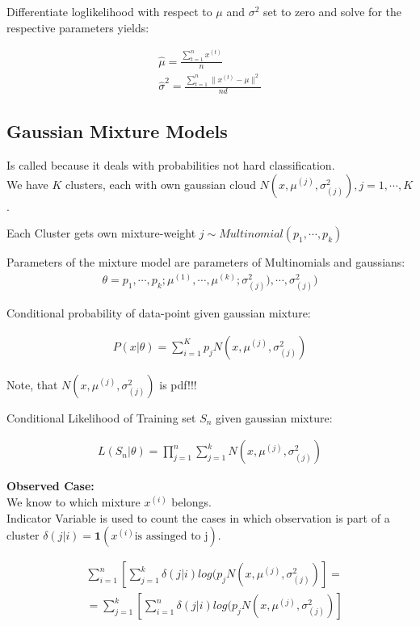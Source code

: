 Differentiate loglikelihood with respect to $\mu$ and $\sigma^2$ set to zero and solve for the respective parameters yields:

\begin{align*}
\hat{\mu } = \frac{\sum _{t=1}^{n} x^{(t)}}{n}\\
\hat{\sigma }^2 = \frac{\sum _{t=1}^ n \| x^{(t)} - \mu \| ^2}{nd}
\end{align*}


\subsection{Gaussian Mixture Models}
Is called  because it  deals with probabilities not hard classification.\\

We have $K$ clusters, each with own gaussian cloud $N(x, \mu^{(j)}, \sigma^2_{(j)}), j=1,\cdots,K$. 

Each Cluster gets own mixture-weight $j \sim Multinomial(p_1,\cdots,p_k)$ 

Parameters of the mixture model are parameters of Multinomials and gaussians: 
\begin{align*}
\theta={p_1,\cdots,p_k;\mu^{(1)},\cdots,\mu^{(k)};\sigma^2_{(j)}),\cdots,\sigma^2_{(j)})}
\end{align*}

Conditional probability of data-point given gaussian mixture:

\begin{align*}
P(x|\theta)=\sum_{i=1}^K p_j N(x,\mu^{(j)},\sigma^2_{(j)})
\end{align*}

Note, that $N(x,\mu^{(j)},\sigma^2_{(j)})$ is pdf!!!

Conditional Likelihood of Training set $S_n$ given gaussian mixture:

\begin{align*}
L(S_n|\theta)= \prod_{j=1}^{n} \sum_{j=1}^{k} N(x,\mu^{(j)},\sigma^2_{(j)})
\end{align*}

\textbf{Observed Case:}\\
We know to which mixture $x^{(i)}$ belongs.\\

Indicator Variable is used to count the cases in which observation is part of a cluster $\delta(j|i)=\textbf{1}(x^{(i)} \text{is assinged to j})$.


\begin{align*}
&\sum_{i=1}^n [\sum_{j=1}^k \delta(j|i) log (p_j N(x,\mu^{(j)},\sigma^2_{(j)})]=\\
&= \sum_{j=1}^k [\sum_{i=1}^n \delta(j|i) log (p_j N(x,\mu^{(j)},\sigma^2_{(j)})]\\
\end{align*}

